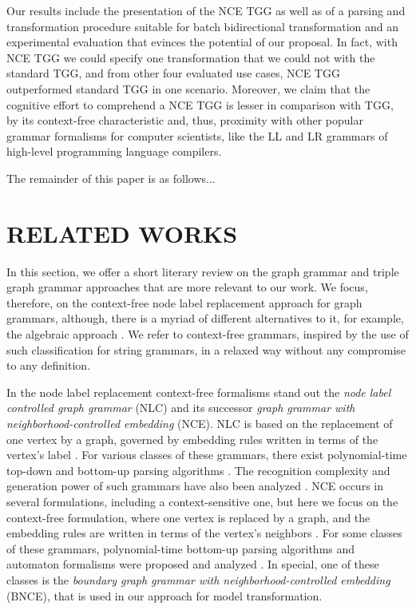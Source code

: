 \documentclass[a4paper,twoside]{article}
\begin{document}
Our results include the presentation of the NCE TGG as well as of a parsing and transformation procedure suitable for batch bidirectional transformation and an experimental evaluation that evinces the potential of our proposal. In fact, with NCE TGG we could specify one transformation that we could not with the standard TGG, and from other four evaluated use cases, NCE TGG outperformed standard TGG in one scenario. Moreover, we claim that the cognitive effort to comprehend a NCE TGG is lesser in comparison with TGG, by its context-free characteristic and, thus, proximity with other popular grammar formalisms for computer scientists, like the LL and LR grammars of high-level programming language compilers.

The remainder of this paper is as follows...

\section{\uppercase{Related Works}}

\noindent In this section, we offer a short literary review on the graph grammar and triple graph grammar approaches that are more relevant to our work. We focus, therefore, on the context-free node label replacement approach for graph grammars, although, there is a myriad of different alternatives to it, for example, the algebraic approach \cite{ehrig1999handbook}. We refer to context-free grammars, inspired by the use of such classification for string grammars, in a relaxed way without any compromise to any definition.

In the node label replacement context-free formalisms stand out the \textit{node label controlled graph grammar} (NLC) and its successor \textit{graph grammar with neighborhood-controlled embedding} (NCE). NLC is based on the replacement of one vertex by a graph, governed by embedding rules written in terms of the vertex's label \cite{rozenberg1986boundary}. For various classes of these grammars, there exist polynomial-time top-down and bottom-up parsing algorithms \cite{flasinski1993parsing,flasinski2014characteristics,rozenberg1986boundary,wanke1991algorithms}. The recognition complexity and generation power of such grammars have also been analyzed \cite{flasinski1998power,kim2012structure}. NCE occurs in several formulations, including a context-sensitive one, but here we focus on the context-free formulation, where one vertex is replaced by a graph, and the embedding rules are written in terms of the vertex's neighbors \cite{janssens1982graph,skodinis1998neighborhood}. For some classes of these grammars, polynomial-time bottom-up parsing algorithms and automaton formalisms were proposed and analyzed \cite{kim2001efficient,brandenburg2005finite}. In special, one of these classes is the \textit{boundary graph grammar with neighborhood-controlled embedding} (BNCE), that is used in our approach for model transformation.
\end{document}
